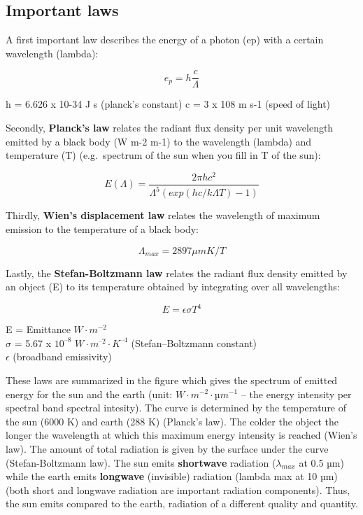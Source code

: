 \documentclass[12pt,oneside]{book}
\begin{document}
\subsection{Important laws}\label{important-laws}

A first important law describes the energy of a photon (ep) with a
certain wavelength (lambda):

\begin{equation} 
  e_p = h  \frac{c}{\Lambda}
  \label{eq:Eq1}
\end{equation}

h = 6.626 x 10-34 J s (planck's constant) c = 3 x 108 m s-1 (speed of
light)

Secondly, \textbf{Planck's law} relates the radiant flux density per
unit wavelength emitted by a black body (W m-2 m-1) to the wavelength
(lambda) and temperature (T) (e.g.~spectrum of the sun when you fill in
T of the sun):

\begin{equation} 
  E(\Lambda) =\frac{2 \pi h c^2}{\Lambda^5\left(exp(hc/k\Lambda T) - 1 \right)}
  \label{eq:Eq2}
\end{equation}

Thirdly, \textbf{Wien's displacement law} relates the wavelength of
maximum emission to the temperature of a black body:

\begin{equation} 
  \Lambda_{max} = 2897 \mu m K / T 
  \label{eq:Eq3}
\end{equation}

Lastly, the \textbf{Stefan-Boltzmann law} relates the radiant flux
density emitted by an object (E) to its temperature obtained by
integrating over all wavelengths:

\begin{equation} 
  E = \epsilon \sigma T^4
  \label{eq:Eq4}
\end{equation}

E = Emittance \(W \cdot m^{-2}\)\\
\(\sigma\) = 5.67 x \(10^{–8}\) \(W \cdot m^{–2} \cdot K^{–4}\)
(Stefan--Boltzmann constant)\\
\(\epsilon\) (broadband emissivity)

These laws are summarized in the figure which gives the spectrum of
emitted energy for the sun and the earth (unit:
\(W \cdot m^{-2} \cdot µm^{-1}\) -- the energy intensity per spectral
band spectral intesity). The curve is determined by the temperature of
the sun (6000 K) and earth (288 K) (Planck's law). The colder the object
the longer the wavelength at which this maximum energy intensity is
reached (Wien's law). The amount of total radiation is given by the
surface under the curve (Stefan-Boltzmann law). The sun emits
\textbf{shortwave} radiation (\(\lambda_{max}\) at 0.5 µm) while the
earth emits \textbf{longwave} (invisible) radiation (lambda max at 10
µm) (both short and longwave radiation are important radiation
components). Thus, the sun emits compared to the earth, radiation of a
different quality and quantity.
\end{document}
